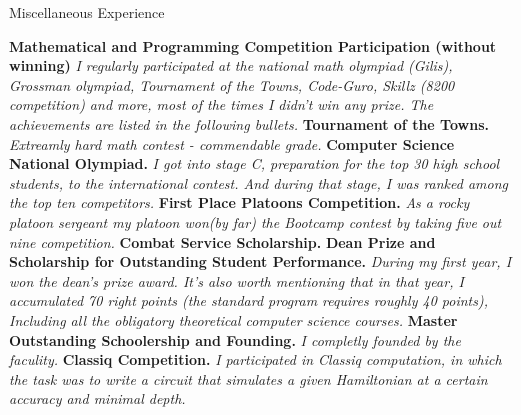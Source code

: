 \begin{rubric}{Miscellaneous Experience}

\entry*[2012 -- 2014] \textbf{Mathematical and Programming Competition Participation (without winning)} \emph{I regularly participated at the national math olympiad (Gilis), Grossman olympiad, Tournament of the Towns, Code-Guro, Skillz (8200 competition) and more, most of the times I didn't win any prize. The achievements are listed in the following bullets.}
\entry*[2014] \textbf{Tournament of the Towns.} \emph{Extreamly hard math contest - commendable grade.}
\entry*[2014] \textbf{Computer Science National Olympiad.} \emph{I got into stage C, preparation for the top 30 high school students, to the international contest. And during that stage, I was ranked among the top ten competitors.}
\ifdefined\ARMY
\entry*[2017] \textbf{First Place Platoons Competition.} \emph{As a rocky platoon sergeant my platoon won(by far) the Bootcamp contest by taking five out nine competition.}     
\entry*[2018] \textbf{Combat Service Scholarship.}  
\fi
\entry*[2018] \textbf{Dean Prize and Scholarship for Outstanding Student Performance.} \emph{During my first year, I won the dean's prize award. It's also worth mentioning that in that year, I accumulated 70 right points (the standard program requires roughly 40 points), Including all the obligatory theoretical computer science courses. }
\entry*[2022] \textbf{Master Outstanding Schoolership and Founding.} \emph{I completly founded by the faculity.} 
\entry*[2022] \textbf{Classiq Competition.} \emph{I participated in Classiq computation, in which the task was to write a circuit that simulates a given Hamiltonian at a certain accuracy and minimal depth. } 
\end{rubric}


